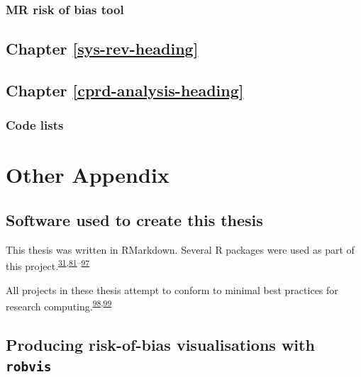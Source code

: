 \documentclass[a4paper, twoside]{templates/ociamthesis}
\begin{document}
\hypertarget{appendix-mr-rob}{%
\subsection{MR risk of bias tool}\label{appendix-mr-rob}}

\hypertarget{appendix-sys-rev}{%
\section{Chapter \ref{sys-rev-heading}}\label{appendix-sys-rev}}

\hypertarget{appendix-cprd-analysis}{%
\section{Chapter \ref{cprd-analysis-heading}}\label{appendix-cprd-analysis}}

\hypertarget{code-lists}{%
\subsection{Code lists}\label{code-lists}}

\hypertarget{other-appendix-heading}{%
\chapter{Other Appendix}\label{other-appendix-heading}}

\hypertarget{software-used-to-create-this-thesis}{%
\section{Software used to create this thesis}\label{software-used-to-create-this-thesis}}

This thesis was written in RMarkdown. Several R packages were used as part of this project.\textsuperscript{\protect\hyperlink{ref-rbiorxiv}{31},\protect\hyperlink{ref-base}{81}--\protect\hyperlink{ref-xfun}{97}}

All projects in these thesis attempt to conform to minimal best practices for research computing.\textsuperscript{\protect\hyperlink{ref-wilson2014}{98},\protect\hyperlink{ref-wilson2017}{99}}

\hypertarget{appendix-robvis}{%
\section{\texorpdfstring{Producing risk-of-bias visualisations with \texttt{robvis}}{Producing risk-of-bias visualisations with robvis}}\label{appendix-robvis}}
\end{document}
